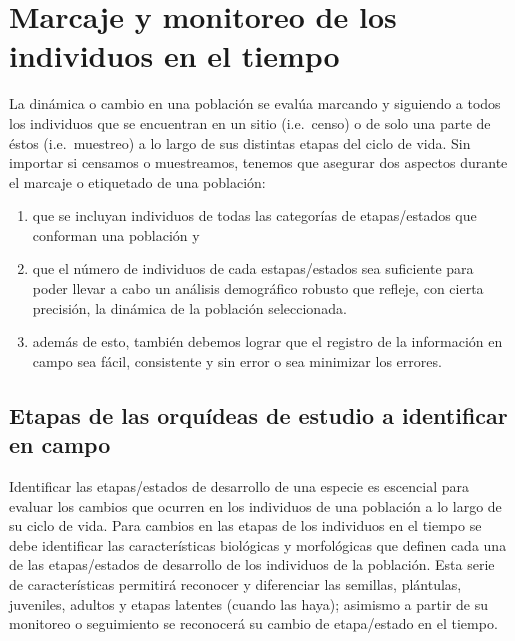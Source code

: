 \documentclass[
]{book}
\theoremstyle{definition}
\theoremstyle{definition}
\theoremstyle{definition}
\theoremstyle{definition}
\theoremstyle{remark}
\begin{document}
\section{Marcaje y monitoreo de los individuos en el tiempo}\label{marcaje-y-monitoreo-de-los-individuos-en-el-tiempo}

La dinámica o cambio en una población se evalúa marcando y siguiendo a todos los individuos que se encuentran en un sitio (i.e.~censo) o de solo una parte de éstos (i.e.~muestreo) a lo largo de sus distintas etapas del ciclo de vida.
Sin importar si censamos o muestreamos, tenemos que asegurar dos aspectos durante el marcaje o etiquetado de una población:

\begin{enumerate}
\def\labelenumi{\arabic{enumi})}
\item
  que se incluyan individuos de todas las categorías de etapas/estados que conforman una población y
\item
  que el número de individuos de cada estapas/estados sea suficiente para poder llevar a cabo un análisis demográfico robusto que refleje, con cierta precisión, la dinámica de la población seleccionada.
\item
  además de esto, también debemos lograr que el registro de la información en campo sea fácil, consistente y sin error o sea minimizar los errores.
\end{enumerate}

\subsection{Etapas de las orquídeas de estudio a identificar en campo}\label{etapas-de-las-orquuxeddeas-de-estudio-a-identificar-en-campo}

Identificar las etapas/estados de desarrollo de una especie es escencial para evaluar los cambios que ocurren en los individuos de una población a lo largo de su ciclo de vida.
Para cambios en las etapas de los individuos en el tiempo se debe identificar las características biológicas y morfológicas que definen cada una de las etapas/estados de desarrollo de los individuos de la población.
Esta serie de características permitirá reconocer y diferenciar las semillas, plántulas, juveniles, adultos y etapas latentes (cuando las haya); asimismo a partir de su monitoreo o seguimiento se reconocerá su cambio de etapa/estado en el tiempo.
\end{document}
